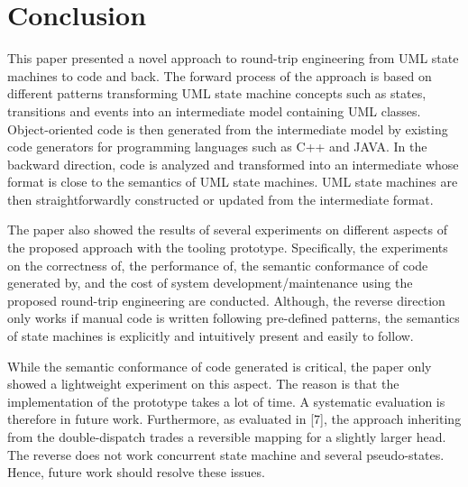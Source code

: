 \section{Conclusion}
\label{sec:conclusion}
This paper presented a novel approach to round-trip engineering from UML state machines to code and back. The forward process of the approach is based on different patterns transforming UML state machine concepts such as states, transitions and events into an intermediate model containing UML classes. Object-oriented code is then generated from the intermediate model by existing code generators for programming languages such as C++ and JAVA. In the backward direction, code is analyzed and transformed into an intermediate whose format is close to the semantics of UML state machines. UML state machines are then straightforwardly constructed or updated from the intermediate format. 
 
The paper also showed the results of several experiments on different aspects of the proposed approach with the tooling prototype. Specifically, the experiments on the correctness of, the performance of, the semantic conformance of code generated by, and the cost of system development/maintenance using the proposed round-trip engineering are conducted. Although, the reverse direction only works if manual code is written following pre-defined patterns, the semantics of state machines is explicitly and intuitively present and easily to follow.

While the semantic conformance of code generated is critical, the paper only showed a lightweight experiment on this aspect. The reason is that the implementation of the prototype takes a lot of time. A systematic evaluation is therefore in future work. Furthermore, as evaluated in [7], the approach inheriting from the double-dispatch trades a reversible mapping for a slightly larger head. The reverse does not work concurrent state machine and several pseudo-states. Hence, future work should resolve these issues.
